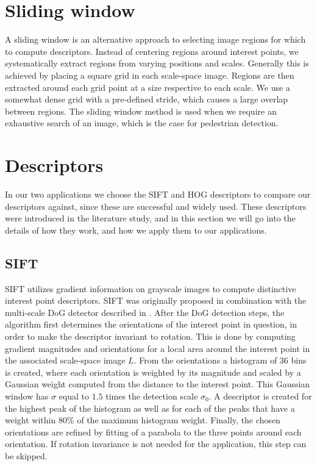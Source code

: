 \documentclass[thesis.tex]{subfiles}
\begin{document}
\section{Sliding window}
\label{sec:slidingWindow}
%
A sliding window is an alternative approach to selecting image regions for which to compute descriptors. Instead of centering regions around interest points, we systematically extract regions from varying positions and scales. Generally this is achieved by placing a square grid in each scale-space image. Regions are then extracted around each grid point at a size respective to each scale. We use a somewhat dense grid with a pre-defined stride, which causes a large overlap between regions. The sliding window method is used when we require an exhaustive search of an image, which is the case for pedestrian detection.

\section{Descriptors}

In our two applications we choose the SIFT and HOG descriptors to compare our descriptors against, since these are successful and widely used. These descriptors were introduced in the literature study, and in this section we will go into the details of how they work, and how we apply them to our applications.
\subsection{SIFT}

SIFT utilizes gradient information on grayscale images to compute distinctive interest point descriptors. SIFT was originally proposed in combination with the multi-scale DoG detector described in . After the DoG detection steps, the algorithm first determines the orientations of the interest point in question, in order to make the descriptor invariant to rotation. This is done by computing gradient magnitudes and orientations for a local area around the interest point in the associated scale-space image $L$. From the orientations a histogram of 36 bins is created, where each orientation is weighted by its magnitude and scaled by a Gaussian weight computed from the distance to the interest point. This Gaussian window has $\sigma$ equal to $1.5$ times the detection scale $\sigma_0$. A descriptor is created for the highest peak of the histogram as well as for each of the peaks that have a weight within 80\% of the maximum histogram weight. Finally, the chosen orientations are refined by fitting of a parabola to the three points around each orientation. If rotation invariance is not needed for the application, this step can be skipped.
\end{document}
